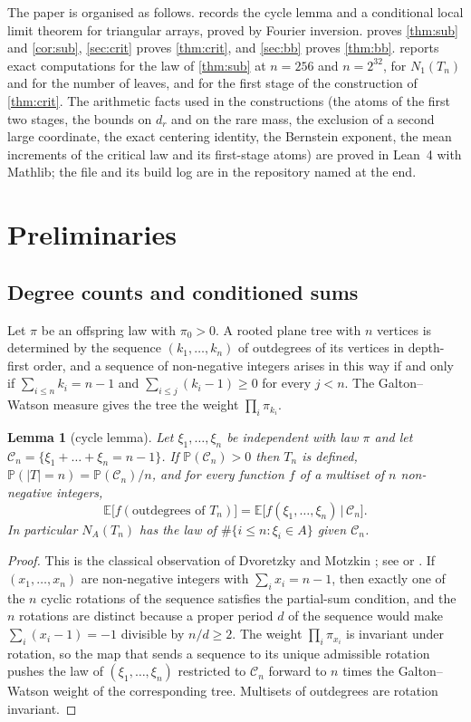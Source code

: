 \documentclass[11pt]{amsart}
\newtheorem{lemma}[theorem]{Lemma}
\theoremstyle{definition}
\newcommand{\E}{\mathbb{E}}
\newcommand{\Prob}{\mathbb{P}}
\newcommand{\Cond}{\mathcal{C}}
\begin{document}
The paper is organised as follows.  records the cycle lemma and a conditional local limit theorem for triangular arrays, proved by Fourier inversion.  proves \cref{thm:sub} and \cref{cor:sub}, \cref{sec:crit} proves \cref{thm:crit}, and \cref{sec:bb} proves \cref{thm:bb}.  reports exact computations for the law of \cref{thm:sub} at $n=256$ and $n=2^{32}$, for $N_1(T_n)$ and for the number of leaves, and for the first stage of the construction of \cref{thm:crit}. The arithmetic facts used in the constructions (the atoms of the first two stages, the bounds on $d_r$ and on the rare mass, the exclusion of a second large coordinate, the exact centering identity, the Bernstein exponent, the mean increments of the critical law and its first-stage atoms) are proved in Lean~4 with Mathlib; the file and its build log are in the repository named at the end.

\section{Preliminaries}\label{sec:prelim}

\subsection{Degree counts and conditioned sums}

Let $\pi$ be an offspring law with $\pi_0>0$. A rooted plane tree with $n$ vertices is determined by the sequence $(k_1,\dots,k_n)$ of outdegrees of its vertices in depth-first order, and a sequence of non-negative integers arises in this way if and only if $\sum_{i\le n}k_i=n-1$ and $\sum_{i\le j}(k_i-1)\ge0$ for every $j<n$. The Galton--Watson measure gives the tree the weight $\prod_i\pi_{k_i}$.

\begin{lemma}[cycle lemma]\label{lem:cycle}
Let $\xi_1,\dots,\xi_n$ be independent with law $\pi$ and let $\Cond_n=\{\xi_1+\dots+\xi_n=n-1\}$. If $\Prob(\Cond_n)>0$ then $T_n$ is defined, $\Prob(|T|=n)=\Prob(\Cond_n)/n$, and for every function $f$ of a multiset of $n$ non-negative integers,
\[
\E\big[f(\text{outdegrees of }T_n)\big]=\E\big[f(\xi_1,\dots,\xi_n)\,\big|\,\Cond_n\big].
\]
In particular $N_A(T_n)$ has the law of $\#\{i\le n:\xi_i\in A\}$ given $\Cond_n$.
\end{lemma}

\begin{proof}
This is the classical observation of Dvoretzky and Motzkin \cite{DM}; see \cite[Section 15]{Janson12} or \cite[Section 6.1]{Pitman}. If $(x_1,\dots,x_n)$ are non-negative integers with $\sum_i x_i=n-1$, then exactly one of the $n$ cyclic rotations of the sequence satisfies the partial-sum condition, and the $n$ rotations are distinct because a proper period $d$ of the sequence would make $\sum_i(x_i-1)=-1$ divisible by $n/d\ge2$. The weight $\prod_i\pi_{x_i}$ is invariant under rotation, so the map that sends a sequence to its unique admissible rotation pushes the law of $(\xi_1,\dots,\xi_n)$ restricted to $\Cond_n$ forward to $n$ times the Galton--Watson weight of the corresponding tree. Multisets of outdegrees are rotation invariant.
\end{proof}
\end{document}
